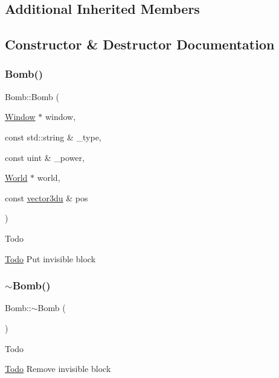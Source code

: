 \subsection*{Additional Inherited Members}


\subsection{Constructor \& Destructor Documentation}
\mbox{\label{class_bomb_adf7a216d9286c61dee5e506a98c2d04c}} 
\subsubsection{\texorpdfstring{Bomb()}{Bomb()}}
{\footnotesize\ttfamily Bomb\+::\+Bomb (\begin{DoxyParamCaption}\item[{\mbox{\hyperlink{class_window}{Window}} $\ast$}]{window,  }\item[{const std\+::string \&}]{\+\_\+type,  }\item[{const uint \&}]{\+\_\+power,  }\item[{\mbox{\hyperlink{class_world}{World}} $\ast$}]{world,  }\item[{const \mbox{\hyperlink{_utility_8hpp_ac675fa2b6c79d0be47ae76e5d0ce38a8}{vector3du}} \&}]{pos }\end{DoxyParamCaption})}

\begin{DoxyRefDesc}{Todo}
\item[\mbox{\hyperlink{todo__todo000001}{Todo}}]Put invisible block \end{DoxyRefDesc}
\mbox{\label{class_bomb_acbb47327cfb2fa429887774ef3597965}} 
\subsubsection{\texorpdfstring{$\sim$Bomb()}{~Bomb()}}
{\footnotesize\ttfamily Bomb\+::$\sim$\+Bomb (\begin{DoxyParamCaption}{ }\end{DoxyParamCaption})}

\begin{DoxyRefDesc}{Todo}
\item[\mbox{\hyperlink{todo__todo000002}{Todo}}]Remove invisible block \end{DoxyRefDesc}


